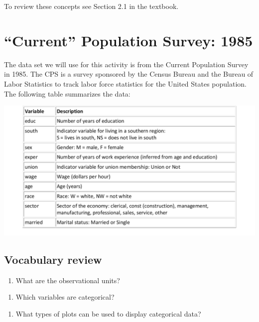 \documentclass[
]{report}
\providecommand{\tightlist}{%
  \setlength{\itemsep}{0pt}\setlength{\parskip}{0pt}}
\begin{document}
To review these concepts see Section 2.1 in the textbook.

\newpage

\hypertarget{current-population-survey-1985}{%
\section{``Current'' Population Survey: 1985}\label{current-population-survey-1985}}

The data set we will use for this activity is from the Current Population Survey in 1985. The CPS is a survey sponsored by the Census Bureau and the Bureau of Labor Statistics to track labor force statistics for the United States population. The following table summarizes the data:

\begin{center}\includegraphics[width=0.7\linewidth]{images/cps} \end{center}

\hypertarget{vocabulary-review}{%
\subsection{Vocabulary review}\label{vocabulary-review}}

\begin{enumerate}
\def\labelenumi{\arabic{enumi}.}
\tightlist
\item
  What are the observational units?
\end{enumerate}

\vspace{0.2in}

\begin{enumerate}
\def\labelenumi{\arabic{enumi}.}
\setcounter{enumi}{1}
\tightlist
\item
  Which variables are categorical?
\end{enumerate}

\vspace{0.4in}

\begin{enumerate}
\def\labelenumi{\arabic{enumi}.}
\setcounter{enumi}{2}
\tightlist
\item
  What types of plots can be used to display categorical data?
\end{enumerate}
\end{document}
